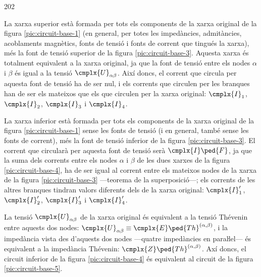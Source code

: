 \begin{dingautolist}{202}
	\item La xarxa superior està formada per tots els  components de la xarxa original de la figura \vref{pic:circuit-base-1} (en general, per totes les impedàncies, admitàncies, acoblaments magnètics, fonts de tensió i fonts de corrent que tingués la xarxa), més la font de tensió superior de la figura \vref{pic:circuit-base-3}. Aquesta xarxa és totalment equivalent a la xarxa original, ja que la font de tensió entre els nodes $\alpha$ i $\beta$ és igual  a  la tensió $\cmplx{U}_{\alpha\beta}$. Així doncs, el corrent que circula per aquesta font de tensió ha de ser nul, i els corrents que circulen per les branques han de ser els mateixos que els que circulen per la xarxa original: $\cmplx{I}_1$, $\cmplx{I}_2$, $\cmplx{I}_3$ i $\cmplx{I}_4$.
	
	\item  La xarxa inferior està formada per tots els  components de la xarxa original de la figura \vref{pic:circuit-base-1} sense les fonts de tensió (i en general, també sense les fonts de corrent),  més la font de tensió inferior de la figura \vref{pic:circuit-base-3}. El corrent que circularà per aquesta font de tensió serà $\cmplx{I}\ped{F}$, ja que la suma dels corrents entre els nodes $\alpha$ i $\beta$ de les dues xarxes de la figura \vref{pic:circuit-base-4}, ha de ser igual al corrent entre els mateixos nodes  de la xarxa de la  figura \vref{pic:circuit-base-3} ---teorema de la superposició---; els corrents de les altres branques tindran valors diferents dels de la xarxa original: $\cmplx{I}_1'$, $\cmplx{I}_2'$, $\cmplx{I}_3'$ i $\cmplx{I}_4'$.
\end{dingautolist}

La tensió $\cmplx{U}_{\alpha\beta}$ de la xarxa original és equivalent a la tensió Thévenin entre aquests dos nodes: $\cmplx{U}_{\alpha\beta} \equiv \cmplx{E}\ped{Th}^{(\alpha, \beta)}$, i la impedància vista des d'aquests dos nodes ---quatre impedàncies en paraŀlel--- és equivalent a la impedància Thévenin: $\cmplx{Z}\ped{Th}^{(\alpha, \beta)}$. Axí doncs, el circuit inferior de la figura  \vref{pic:circuit-base-4} és equivalent al circuit de la figura \vref{pic:circuit-base-5}.

\begin{center}
	
	\label{pic:circuit-base-5}
\end{center}


